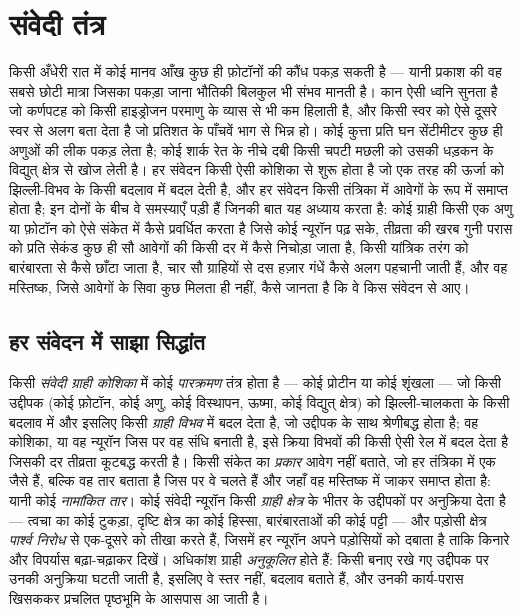 \chapter{संवेदी तंत्र}\label{ch:b3:sensory-systems}

किसी अँधेरी रात में कोई मानव आँख कुछ ही फ़ोटॉनों की कौंध पकड़ सकती है
--- यानी प्रकाश की वह सबसे छोटी मात्रा जिसका पकड़ा जाना भौतिकी बिलकुल
भी संभव मानती है। कान ऐसी ध्वनि सुनता है जो कर्णपटह को किसी हाइड्रोजन
परमाणु के व्यास से भी कम हिलाती है, और किसी स्वर को ऐसे दूसरे स्वर से
अलग बता देता है जो प्रतिशत के पाँचवें भाग से भिन्न हो। कोई कुत्ता
प्रति घन सेंटीमीटर कुछ ही अणुओं की लीक पकड़ लेता है; कोई शार्क रेत के
नीचे दबी किसी चपटी मछली को उसकी धड़कन के विद्युत् क्षेत्र से खोज लेती
है। हर संवेदन किसी ऐसी कोशिका से शुरू होता है जो एक तरह की ऊर्जा को
झिल्ली-विभव के किसी बदलाव में बदल देती है, और हर संवेदन किसी तंत्रिका
में आवेगों के रूप में समाप्त होता है; इन दोनों के बीच वे समस्याएँ पड़ी
हैं जिनकी बात यह अध्याय करता है: कोई ग्राही किसी एक अणु या फ़ोटॉन को
ऐसे संकेत में कैसे प्रवर्धित करता है जिसे कोई न्यूरॉन पढ़ सके, तीव्रता
की खरब गुनी परास को प्रति सेकंड कुछ ही सौ आवेगों की किसी दर में कैसे
निचोड़ा जाता है, किसी यांत्रिक तरंग को बारंबारता से कैसे छाँटा जाता है,
चार सौ ग्राहियों से दस हज़ार गंधें कैसे अलग पहचानी जाती हैं, और वह
मस्तिष्क, जिसे आवेगों के सिवा कुछ मिलता ही नहीं, कैसे जानता है कि वे
किस संवेदन से आए।

\section{हर संवेदन में साझा सिद्धांत}

\begin{definition}[पारक्रमण, कूटलेखन और अनुकूलन]\label{def:b3:sensory-systems:principles}
किसी \emph{संवेदी ग्राही कोशिका} में कोई \emph{पारक्रमण} तंत्र होता है
--- कोई प्रोटीन या कोई शृंखला --- जो किसी उद्दीपक (कोई फ़ोटॉन, कोई अणु,
कोई विस्थापन, ऊष्मा, कोई विद्युत् क्षेत्र) को झिल्ली-चालकता के किसी
बदलाव में और इसलिए किसी \emph{ग्राही विभव} में बदल देता है, जो उद्दीपक
के साथ श्रेणीबद्ध होता है; वह कोशिका, या वह न्यूरॉन जिस पर वह संधि
बनाती है, इसे क्रिया विभवों की किसी ऐसी रेल में बदल देता है जिसकी दर
तीव्रता कूटबद्ध करती है। किसी संकेत का \emph{प्रकार} आवेग नहीं बताते,
जो हर तंत्रिका में एक जैसे हैं, बल्कि वह तार बताता है जिस पर वे चलते
हैं और जहाँ वह मस्तिष्क में जाकर समाप्त होता है: यानी कोई
\emph{नामांकित तार}। कोई संवेदी न्यूरॉन किसी \emph{ग्राही क्षेत्र} के
भीतर के उद्दीपकों पर अनुक्रिया देता है --- त्वचा का कोई टुकड़ा, दृष्टि
क्षेत्र का कोई हिस्सा, बारंबारताओं की कोई पट्टी --- और पड़ोसी क्षेत्र
\emph{पार्श्व निरोध} से एक-दूसरे को तीखा करते हैं, जिसमें हर न्यूरॉन
अपने पड़ोसियों को दबाता है ताकि किनारे और विपर्यास बढ़ा-चढ़ाकर दिखें।
अधिकांश ग्राही \emph{अनुकूलित} होते हैं: किसी बनाए रखे गए उद्दीपक पर
उनकी अनुक्रिया घटती जाती है, इसलिए वे स्तर नहीं, बदलाव बताते हैं, और
उनकी कार्य-परास खिसककर प्रचलित पृष्ठभूमि के आसपास आ जाती है।
\end{definition}

